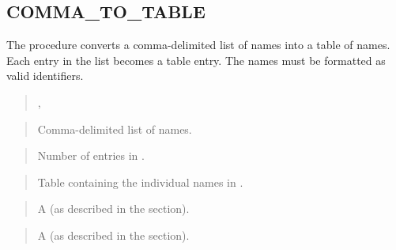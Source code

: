 \documentclass[letterpaper,10pt,english,openany,oneside]{sphinxmanual}
\begin{document}
\newpage


\subsection{COMMA\_TO\_TABLE}
\label{\detokenize{dbms_utility:comma-to-table}}
The  procedure converts a comma-delimited list of names
into a table of names. Each entry in the list becomes a table entry. The
names must be formatted as valid identifiers.
\begin{quote}

,
\begin{quote}

\end{quote}
\end{quote}


\begin{quote}

Comma-delimited list of names.
\end{quote}

\begin{quote}

Number of entries in .
\end{quote}

\begin{quote}

Table containing the individual names in .
\end{quote}

\begin{quote}

A  (as described in the {\hyperref[\detokenize{dbms_utility:lname-array}]{}} section).
\end{quote}

\begin{quote}

A  (as described in the {\hyperref[\detokenize{dbms_utility:uncl-array}]{}} section).
\end{quote}
\end{document}
